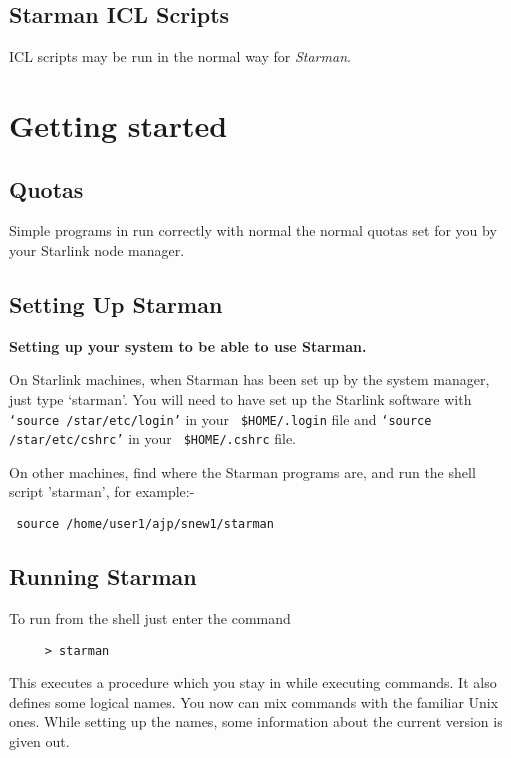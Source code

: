 \subsection{Starman ICL Scripts}
 
{\small ICL} scripts may be run in the normal way for {\it Starman}.
 
 
 
\section{Getting started}
 
\subsection{Quotas}
 
Simple programs in \starman run correctly with normal the normal quotas
set for you by your Starlink node manager.
 
\subsection{Setting Up Starman}
 
  {\bf \hspace*{2ex} Setting up your system to be able to use Starman.}
 
On Starlink machines, when Starman has been set up by the system
manager, just type `starman'.  You will need to have set up the
Starlink software with {\tt `source /star/etc/login'} in your {\tt
\$HOME/.login} file and {\tt `source /star/etc/cshrc'} in your {\tt
\$HOME/.cshrc} file.

On other machines, find where the Starman programs are, and run the
shell script 'starman', for example:-

      \verb# source /home/user1/ajp/snew1/starman #

\subsection{Running Starman}

To run \starman from the shell just enter the command

\begin{verbatim}
     > starman 
\end{verbatim}

This executes a procedure which you stay in while executing \starman
commands. It also defines some logical names. You now can mix \starman
commands with the familiar {\small Unix } ones.  While setting up the
names, some information about the current version is given out.

